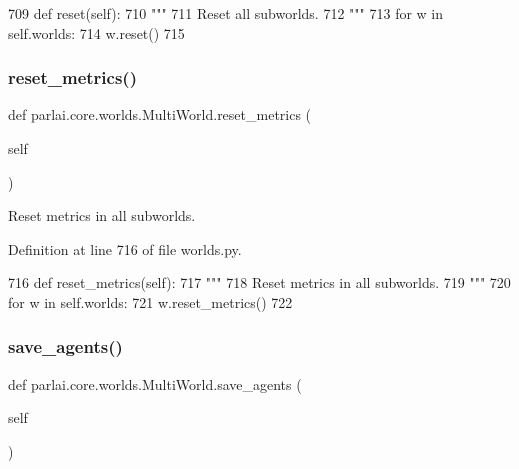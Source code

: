 \begin{DoxyCode}
709     \textcolor{keyword}{def }reset(self):
710         \textcolor{stringliteral}{"""}
711 \textcolor{stringliteral}{        Reset all subworlds.}
712 \textcolor{stringliteral}{        """}
713         \textcolor{keywordflow}{for} w \textcolor{keywordflow}{in} self.worlds:
714             w.reset()
715 
\end{DoxyCode}
\mbox{\label{classparlai_1_1core_1_1worlds_1_1MultiWorld_a7d52dd60bfa5654bfc4ad656ccb07fa1}} 
\subsubsection{\texorpdfstring{reset\+\_\+metrics()}{reset\_metrics()}}
{\footnotesize\ttfamily def parlai.\+core.\+worlds.\+Multi\+World.\+reset\+\_\+metrics (\begin{DoxyParamCaption}\item[{}]{self }\end{DoxyParamCaption})}

\begin{DoxyVerb}Reset metrics in all subworlds.
\end{DoxyVerb}
 

Definition at line 716 of file worlds.\+py.


\begin{DoxyCode}
716     \textcolor{keyword}{def }reset\_metrics(self):
717         \textcolor{stringliteral}{"""}
718 \textcolor{stringliteral}{        Reset metrics in all subworlds.}
719 \textcolor{stringliteral}{        """}
720         \textcolor{keywordflow}{for} w \textcolor{keywordflow}{in} self.worlds:
721             w.reset\_metrics()
722 
\end{DoxyCode}
\mbox{\label{classparlai_1_1core_1_1worlds_1_1MultiWorld_a4d72a950f8aae3d248a9694908f0fc85}} 
\subsubsection{\texorpdfstring{save\+\_\+agents()}{save\_agents()}}
{\footnotesize\ttfamily def parlai.\+core.\+worlds.\+Multi\+World.\+save\+\_\+agents (\begin{DoxyParamCaption}\item[{}]{self }\end{DoxyParamCaption})}

